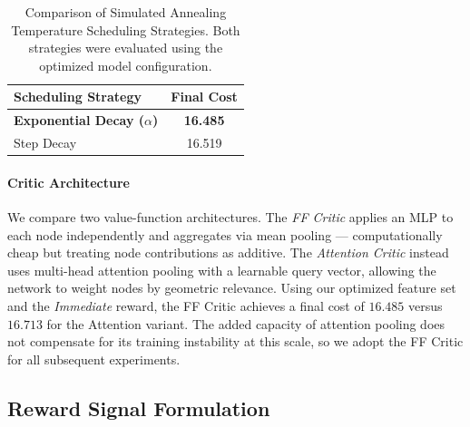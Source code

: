 \documentclass[letterpaper]{article} %
\begin{document}
\begin{table}[t]
\centering
\small
\caption{Comparison of Simulated Annealing Temperature Scheduling Strategies. Both strategies were evaluated using the optimized model configuration.}
\label{tab:temp_scheduling}
\begin{tabular}{l c}
\toprule
\textbf{Scheduling Strategy} & \textbf{Final Cost} \\
\midrule
\textbf{Exponential Decay ($\alpha$)} & \textbf{16.485} \\
Step Decay & 16.519 \\
\bottomrule
\end{tabular}
\end{table}


\paragraph{Critic Architecture}
We compare two value-function architectures. The \textit{FF Critic} applies an MLP to each node independently and aggregates via mean pooling — computationally cheap but treating node contributions as additive. The \textit{Attention Critic} instead uses multi-head attention pooling with a learnable query vector, allowing the network to weight nodes by geometric relevance. Using our optimized feature set and the \textit{Immediate} reward, the FF Critic achieves a final cost of $16.485$ versus $16.713$ for the Attention variant. The added capacity of attention pooling does not compensate for its training instability at this scale, so we adopt the FF Critic for all subsequent experiments.

\subsection{Reward Signal Formulation}
\label{sec:reward_formulation}
\end{document}
